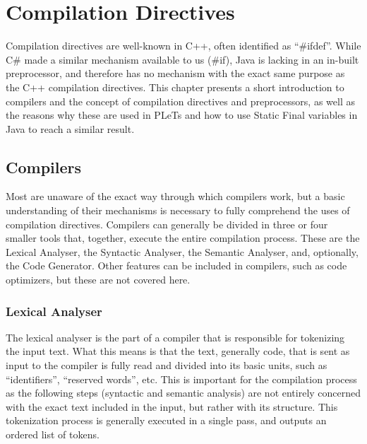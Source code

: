 \chapter{Compilation Directives}
\label{ch:staticfinal}

Compilation directives are well-known in C++, often identified as ``\#ifdef''. While C\# made a similar mechanism available to us (\#if), Java is lacking in an in-built preprocessor, and therefore has no mechanism with the exact same purpose as the C++ compilation directives. This chapter presents a short introduction to compilers and the concept of compilation directives and preprocessors, as well as the reasons why these are used in PLeTs and how to use Static Final variables in Java to reach a similar result.


\section{Compilers}

Most are unaware of the exact way through which compilers work, but a basic understanding of their mechanisms is necessary to fully comprehend the uses of compilation directives. Compilers can generally be divided in three or four smaller tools that, together, execute the entire compilation process. These are the Lexical Analyser, the Syntactic Analyser, the Semantic Analyser, and, optionally, the Code Generator. Other features can be included in compilers, such as code optimizers, but these are not covered here.


\subsection{Lexical Analyser}

The lexical analyser is the part of a compiler that is responsible for tokenizing the input text. What this means is that the text, generally code, that is sent as input to the compiler is fully read and divided into its basic units, such as ``identifiers'', ``reserved words'', etc. This is important for the compilation process as the following steps (syntactic and semantic analysis) are not entirely concerned with the exact text included in the input, but rather with its structure. This tokenization process is generally executed in a single pass, and outputs an ordered list of tokens.

